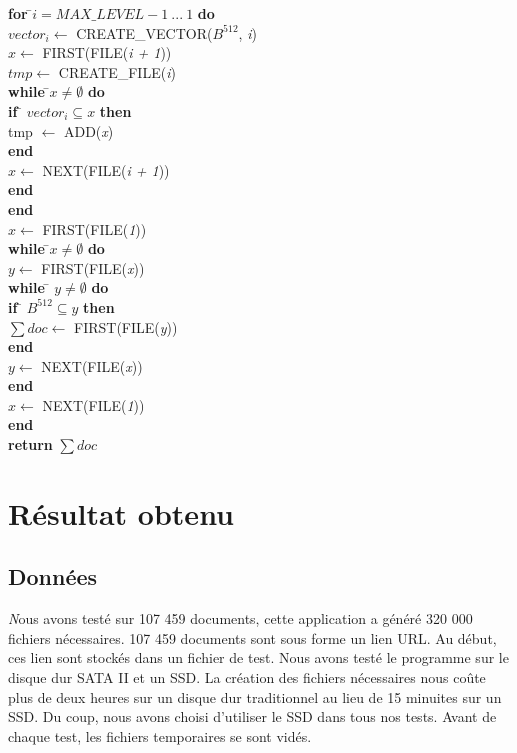 \begin{flushleft}
\begin{framed}
\begin{tabbing}
			\textbf{for }\=$i = MAX\_LEVEL - 1\ ...\ 1$ \textbf{do}\\
					\> $vector_i \leftarrow$ CREATE\_VECTOR($B^{512}$, \textit{i})\\
					\> $x \leftarrow$ FIRST(FILE(\textit{i + 1}))\\
					\> $tmp \leftarrow$ CREATE\_FILE(\textit{i})\\
					\> \textbf{while }\=$x \neq \emptyset$\textbf{ do}\\
					\> \> \textbf{if }\= $vector_i \subseteq x$\textbf{ then}\\
					\> \> \> tmp $\leftarrow$ ADD(\textit{x})\\
					\> \> \textbf{end}\\
					\> \> $x \leftarrow$ NEXT(FILE(\textit{i + 1}))\\
					\> \textbf{end}\\
			\textbf{end}	\\
			$x \leftarrow$ FIRST(FILE(\textit{1}))\\
			\textbf{while }\=$x \neq \emptyset$\textbf{ do}\\
					\> $y \leftarrow $ FIRST(FILE(\textit{x}))\\
					\> \textbf{while }\= $y \neq \emptyset$\textbf{ do}\\
					\> \> \textbf{if }\= $B^{512} \subseteq y$\textbf{ then}\\
					\> \> \> $\sum doc \leftarrow$ FIRST(FILE(\textit{y}))\\
					\> \> \textbf{end}\\
					\> \> $y \leftarrow$ NEXT(FILE(\textit{x}))\\
					\> \textbf{end}\\
					\> $x \leftarrow$ NEXT(FILE(\textit{1}))\\
			\textbf{end}\\
			\textbf{return} $\sum doc$
	    	\end{tabbing}		
	\end{framed}
\end{flushleft}

\chapter{Résultat obtenu}
\section{Données}
	{\huge \itshape N}ous avons testé sur 107 459 documents, cette application a généré 320 000 fichiers nécessaires. 107 459 documents sont sous forme un lien URL. Au début, ces lien sont stockés dans un fichier de test. Nous avons testé le programme sur le disque dur SATA II et un SSD. La création des fichiers nécessaires nous coûte plus de deux heures sur un disque dur traditionnel au lieu de 15 minuites sur un SSD. Du coup, nous avons choisi d'utiliser le SSD dans tous nos tests. Avant de chaque test, les fichiers temporaires se sont vidés.
	
